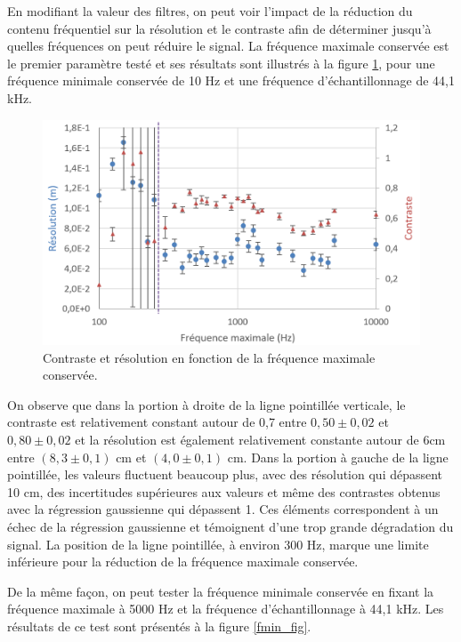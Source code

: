 ﻿\documentclass[11pt,letterpaper]{article}
\begin{document}
En modifiant la valeur des filtres, on peut voir l'impact de la réduction du contenu 
fréquentiel sur la résolution et le contraste afin de déterminer jusqu'à quelles 
fréquences on peut réduire le signal. La fréquence maximale conservée est le premier
paramètre testé et ses résultats sont illustrés à la figure \ref{fmax_fig}, pour une 
fréquence minimale conservée de 10 Hz et une fréquence d'échantillonnage de 44,1 kHz.

\begin{figure}[H]
    \centering
    \includegraphics[scale=0.55]{Freqmax_graph.png}
    \caption{Contraste et résolution en fonction de la fréquence maximale conservée.}
    \label{fmax_fig}
\end{figure}

On observe que dans la portion à droite de la ligne pointillée verticale, le 
contraste est relativement constant autour de 0,7 entre $0,50 \pm 0,02$ et $0,80 \pm 0,02$ et 
la résolution est également relativement constante autour de 6cm entre $(8,3 \pm 0,1)$ cm et 
$(4,0 \pm 0,1)$ cm. Dans la portion à gauche de la ligne pointillée, les valeurs 
fluctuent beaucoup plus, avec des résolution qui dépassent 10 cm, des incertitudes 
supérieures aux valeurs et même des contrastes obtenus avec la régression gaussienne
qui dépassent 1. Ces éléments correspondent à un échec de la régression gaussienne 
et témoignent d'une trop grande dégradation du signal. La position de la ligne 
pointillée, à environ 300 Hz, marque une limite inférieure pour la réduction de 
la fréquence maximale conservée.

De la même façon, on peut tester la fréquence minimale conservée en fixant la 
fréquence maximale à 5000 Hz et la fréquence d'échantillonnage à 44,1 kHz. Les 
résultats de ce test sont présentés à la figure \ref{fmin_fig}.
\end{document}
